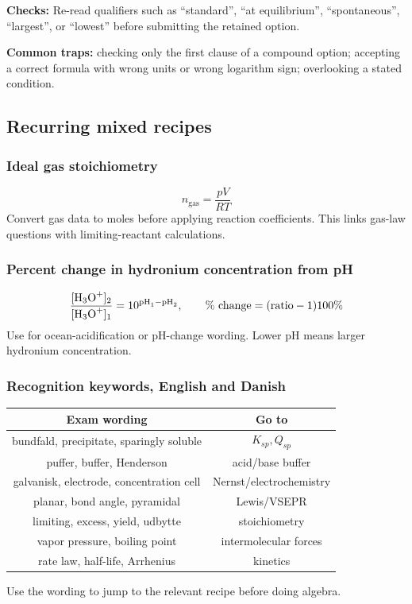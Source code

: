 \textbf{Checks:} Re-read qualifiers such as ``standard'', ``at equilibrium'', ``spontaneous'', ``largest'', or ``lowest'' before submitting the retained option.

\textbf{Common traps:} checking only the first clause of a compound option; accepting a correct formula with wrong units or wrong logarithm sign; overlooking a stated condition.

\subsection{Recurring mixed recipes}

\subsubsection{Ideal gas stoichiometry}
\begin{equation}\label{eq:strategy:gas-moles}
n_{\mathrm{gas}}=\frac{pV}{RT}
\end{equation}
Convert gas data to moles before applying reaction coefficients. This links gas-law questions with limiting-reactant calculations.

\subsubsection{Percent change in hydronium concentration from pH}
\begin{equation}\label{eq:strategy:ph-percent-change}
\frac{[\ce{H3O+}]_2}{[\ce{H3O+}]_1}=10^{\mathrm{pH}_1-\mathrm{pH}_2}, \qquad
\%\text{ change}=(\text{ratio}-1)100\%
\end{equation}
Use for ocean-acidification or pH-change wording. Lower pH means larger hydronium concentration.

\subsubsection{Recognition keywords, English and Danish}
\begin{center}
\begin{tabular}{c c}
\toprule
Exam wording & Go to\\
\midrule
bundfald, precipitate, sparingly soluble & \(K_{sp}, Q_{sp}\)\\
puffer, buffer, Henderson & acid/base buffer\\
galvanisk, electrode, concentration cell & Nernst/electrochemistry\\
planar, bond angle, pyramidal & Lewis/VSEPR\\
limiting, excess, yield, udbytte & stoichiometry\\
vapor pressure, boiling point & intermolecular forces\\
rate law, half-life, Arrhenius & kinetics\\
\bottomrule
\end{tabular}
\end{center}
Use the wording to jump to the relevant recipe before doing algebra.
